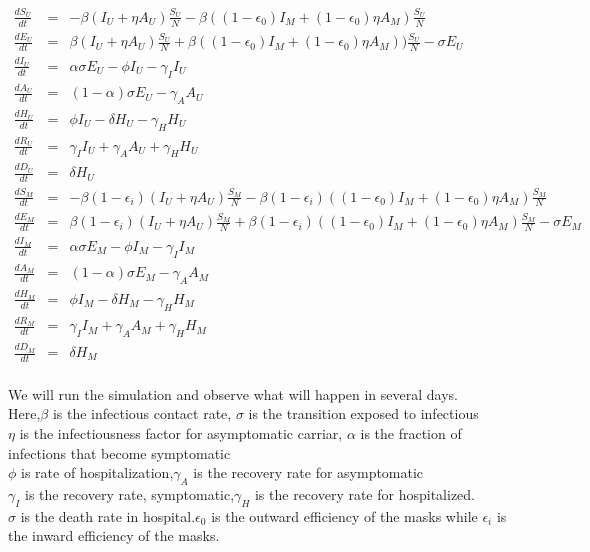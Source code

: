 \documentclass{article}
\begin{document}
\begin{minipage}{0.35\textwidth}
\tiny
\begin{eqnarray}
  \frac{dS_{U}}{dt} &=& -\beta(I_{U}+\eta A_{U})\frac{S_{U}}{N}-\beta((1-\epsilon_{0})I_{M}+(1-\epsilon_{0})\eta A_{M})\frac{S_{U}}{N}\nonumber\\
  \frac{dE_{U}}{dt} &=& \beta(I_{U}+\eta{A}_{U})\frac{S_{U}}{N}+\beta((1-\epsilon_{0})I_{M}+(1-\epsilon_{0})\eta A_{M}))\frac{S_{U}}{N}-\sigma E_{U}\nonumber\\
  \frac{dI_{U}}{dt} &=& \alpha\sigma E_{U}-\phi I_{U} - \gamma_{I}I_{U}\nonumber\\
  \frac{dA_{U}}{dt} &=& (1-\alpha)\sigma E_{U}-\gamma_{A}A_{U}\nonumber\\
  \frac{dH_{U}}{dt} &=& \phi I_{U}-\delta H_{U}-\gamma_{H}H_{U}\nonumber\\
  \frac{dR_{U}}{dt} &=& \gamma_{I}I_{U}+\gamma_{A}A_{U}+\gamma_{H}H_{U}\nonumber\\
  \frac{dD_{U}}{dt} &=& \delta H_{U}\nonumber\\
  \frac{dS_{M}}{dt} &=& -\beta (1-\epsilon_{i})(I_{U}+\eta A_{U})\frac{S_{M}}{N}-\beta(1-\epsilon_{i})((1-\epsilon_{0})I_{M}+(1-\epsilon_{0})\eta A_{M})\frac{S_{M}}{N}\nonumber\\
  \frac{dE_{M}}{dt} &=& \beta(1-\epsilon_{i})(I_{U}+\eta A_{U})\frac{S_{M}}{N}+\beta(1-\epsilon_{i})((1-\epsilon_{0})I_{M}+(1-\epsilon_{0})\eta A_{M})\frac{S_{M}}{N}-\sigma E_{M}\nonumber\\
  \frac{dI_{M}}{dt} &=& \alpha\sigma E_{M}-\phi I_{M}-\gamma_{I} I_{M}\nonumber\\
  \frac{dA_{M}}{dt} &=& (1-\alpha)\sigma E_{M}-\gamma_{A}A_{M}\nonumber\\
  \frac{dH_{M}}{dt} &=& \phi I_{M}-\delta H_{M}-\gamma_{H} H_{M}\nonumber\\
  \frac{dR_{M}}{dt} &=& \gamma_{I}I_{M}+\gamma_{A}A_{M}+\gamma_{H}H_{M}\nonumber\\
  \frac{dD_{M}}{dt} &=& \delta H_{M}\nonumber\\
  \end{eqnarray}
\end{minipage}

We will run the simulation and observe what will happen in several days. \\Here,$\beta$ is the infectious contact rate, $\sigma$ is the transition exposed to infectious\\$\eta$ is the infectiousness factor for asymptomatic carriar, $\alpha$ is the fraction of infections that become symptomatic\\
$\phi$ is rate of hospitalization,$\gamma_{A}$ is the recovery rate for asymptomatic
\\$\gamma_{I}$ is the recovery rate, symptomatic,$\gamma_{H}$ is the recovery rate for hospitalized.\\$\sigma$ is the death rate in hospital.$\epsilon_{0}$ is the outward efficiency of the masks while $\epsilon_{i}$ is the inward efficiency of the masks.\\
\end{document}
